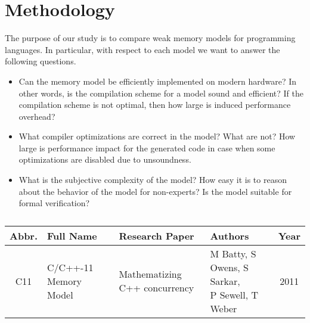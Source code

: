 \section{Methodology}

The purpose of our study is to compare weak memory models for programming languages.
In particular, with respect to each model we want to answer the following questions.

\begin{itemize}
  
  \item Can the memory model be efficiently implemented on modern hardware? 
    In other words, is the compilation scheme for a model sound and efficient?
    If the compilation scheme is not optimal, then how large is induced performance overhead?

  \item What compiler optimizations are correct in the model? What are not? 
    How large is performance impact for the generated code in case when 
    some optimizations are disabled due to unsoundness.

  \item What is the subjective complexity of the model?
    How easy it is to reason about the behavior of the model for non-experts?
    Is the model suitable for formal verification?
  
\end{itemize}

\onecolumn

\begin{table*}\footnotesize
\begin{tabular}{|c|l|l|l|c|}
  \hline

  \textbf{Abbr.}          & 
  \textbf{Full Name}      & 
  \textbf{Research Paper} & 
  \textbf{Authors}        &
  \textbf{Year}           \\ 
  \hline

  C11 & C/C++-11 Memory Model 
      & Mathematizing C++ concurrency
      & \makecell[l]{M Batty, S Owens, S Sarkar, \\P Sewell, T Weber}
      & 2011 
  \\ \hline

\end{tabular}
\caption{}
\label{table:mmodels}
\end{table*}

\twocolumn


